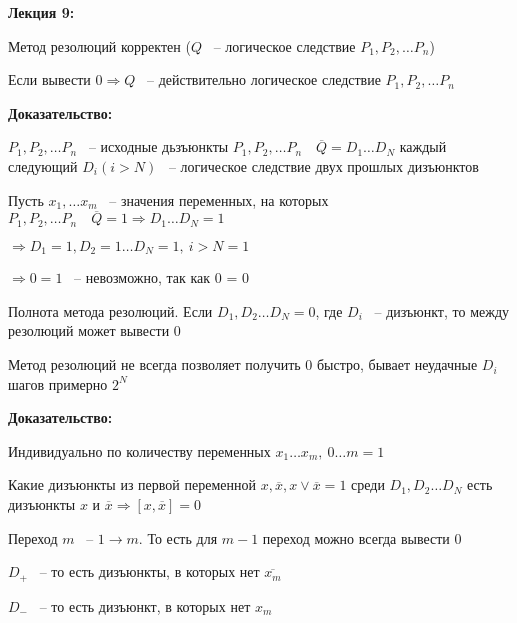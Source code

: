 \documentclass[russian]{lecture-notes}
\begin{document}
    \textbf{Лекция 9:}

    \begin{proposition}
        Метод резолюций корректен ($Q$ ~-- логическое следствие $P_1, P_2, \dots P_n$)

        Если вывести $0 \Rightarrow Q$ ~-- действительно логическое следствие $P_1, P_2, \dots P_n$
    \end{proposition}

    \textbf{Доказательство:}

    $P_1, P_2, \dots P_n$ ~-- исходные дьзъюнкты $P_1, P_2, \dots P_n \quad \overline{Q} = D_1 \dots D_N$ каждый следующий $D_i(i > N)$ ~-- логическое следствие двух прошлых дизъюнктов

    Пусть $x_1, \dots x_m$ ~-- значения переменных, на которых $P_1, P_2, \dots P_n \quad \overline{Q} = 1 \Rightarrow D_1 \dots D_N = 1$

    $\Rightarrow D_1 = 1, D_2 = 1 \dots D_N = 1, \: i > N = 1$

    $\Rightarrow 0 = 1$ ~-- невозможно, так как 0 = 0

    \begin{proposition}
        Полнота метода резолюций. Если $D_1, D_2 \dots D_N = 0$, где $D_i$ ~-- дизъюнкт, то между резолюций может вывести 0
    \end{proposition}

    \begin{remark}
        Метод резолюций не всегда позволяет получить 0 быстро, бывает неудачные $D_i$ шагов примерно $2^N$
    \end{remark}

    \textbf{Доказательство:}

    Индивидуально по количеству переменных $x_1 \dots x_m, \: 0 \dots m = 1$

    Какие дизъюнкты из первой переменной $x, \overline{x}, x \lor \overline{x} = 1$ среди $D_1, D_2 \dots D_N$ есть дизъюнкты $x$ и $\overline{x} \Rightarrow [x, \overline{x}] = 0$

    Переход $m$ ~-- $1 \rightarrow m.$  То есть для $m - 1$ переход можно всегда вывести 0

    $D_+$ ~-- то есть дизъюнкты, в которых нет $\overline{x_m}$

    $D_-$ ~-- то есть дизъюнкт, в которых нет $x_m$
\end{document}

